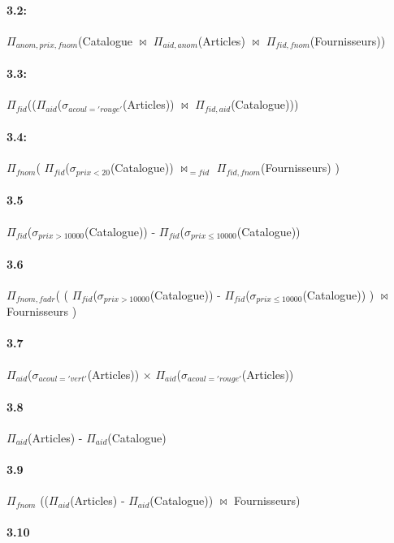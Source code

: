 \documentclass[a4paper,10pt]{article}
\begin{document}
\paragraph{3.2:}
$\Pi_{anom,prix,fnom}$(Catalogue $\bowtie$ $\Pi_{aid,anom}$(Articles) $\bowtie$ $\Pi_{fid,fnom}$(Fournisseurs))

\paragraph{3.3:}
$\Pi_{fid}$(($\Pi_{aid}$($\sigma_{acoul='rouge'}$(Articles)) $\bowtie$ $\Pi_{fid, aid}$(Catalogue)))

\paragraph{3.4:}
$\Pi_{fnom}$(
	$\Pi_{fid}$($\sigma_{prix < 20}$(Catalogue))
	$\bowtie_{=fid}$ 
	$\Pi_{fid,fnom}$(Fournisseurs)
)

\paragraph{3.5}
$\Pi_{fid}$($\sigma_{prix>10000}$(Catalogue)) -  $\Pi_{fid}$($\sigma_{prix\leq10000}$(Catalogue))

\paragraph{3.6}
$\Pi_{fnom, fadr}$(
	(
	$\Pi_{fid}$($\sigma_{prix>10000}$(Catalogue)) -  $\Pi_{fid}$($\sigma_{prix \leq 10000}$(Catalogue))
	)
	$\bowtie$
	Fournisseurs
)

\paragraph{3.7}
$\Pi_{aid}$($\sigma_{acoul='vert'}$(Articles))
$\times$
$\Pi_{aid}$($\sigma_{acoul='rouge'}$(Articles))

\paragraph{3.8}
$\Pi_{aid}$(Articles) - $\Pi_{aid}$(Catalogue)

\paragraph{3.9}
$\Pi_{fnom}$
(($\Pi_{aid}$(Articles) - $\Pi_{aid}$(Catalogue))
$\bowtie$
Fournisseurs)

\paragraph{3.10}
\end{document}
